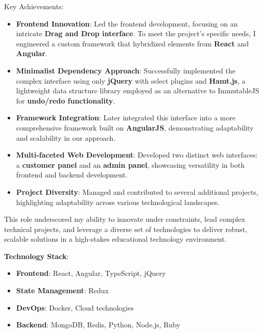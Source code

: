 Key Achievements:
\begin{itemize}
    \item \textbf{Frontend Innovation}: Led the frontend development, focusing on an intricate \textbf{Drag and Drop interface}. To meet the project's specific needs, I engineered a custom framework that hybridized elements from \textbf{React} and \textbf{Angular}.
    
    \item \textbf{Minimalist Dependency Approach}: Successfully implemented the complex interface using only \textbf{jQuery} with select plugins and \textbf{Hamt.js}, a lightweight data structure library employed as an alternative to ImmutableJS for \textbf{undo/redo functionality}.
    
    \item \textbf{Framework Integration}: Later integrated this interface into a more comprehensive framework built on \textbf{AngularJS}, demonstrating adaptability and scalability in our approach.
    
    \item \textbf{Multi-faceted Web Development}: Developed two distinct web interfaces: a \textbf{customer panel} and an \textbf{admin panel}, showcasing versatility in both frontend and backend development.
    
    \item \textbf{Project Diversity}: Managed and contributed to several additional projects, highlighting adaptability across various technological landscapes.
\end{itemize}

This role underscored my ability to innovate under constraints, lead complex technical projects, and leverage a diverse set of technologies to deliver robust, scalable solutions in a high-stakes educational technology environment.

\smallskip
\textbf{Technology Stack}:
\begin{itemize}
    \item \textbf{Frontend}: React, Angular, TypeScript, jQuery
    \item \textbf{State Management}: Redux
    \item \textbf{DevOps}: Docker, Cloud technologies
    \item \textbf{Backend}: MongoDB, Redis, Python, Node.js, Ruby
\end{itemize}

\vspace{4cm}
\newpage
{}
\bigskip

